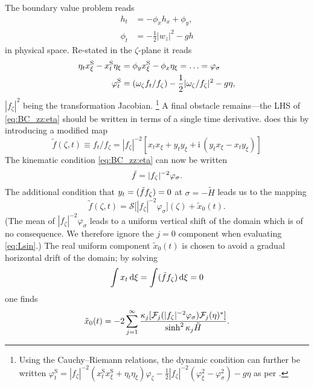 \documentclass[a4paper,12pt]{article}
\newcommand{\mr}{\mathrm}
\newcommand{\mc}{\mathcal}
\renewcommand{\S}{^\mr{S}}
\newcommand{\ii}{\mr{i}\,}
\renewcommand{\_}[1]{_\mr{#1}}
\let\Re\relax
\let\Im\relax
\DeclareMathOperator\Re{Re}
\DeclareMathOperator\Im{Im}
\newcommand{\rbr}[1]{\left(#1\right)}
\newcommand{\z}{z}
\newcommand{\x}{x}
\newcommand{\y}{y}
\newcommand{\zz}{\zeta}
\newcommand{\xx}{\xi}
\newcommand{\yy}{\sigma}
\newcommand{\kk}{\kappa}
\newcommand{\zmap}{f}
\newcommand{\ww}{\omega}
\newcommand{\Hzz}{\tilde H}
\newcommand{\hzz}{\eta}
\newcommand{\Lsin}{\mc S}
\newcommand{\FF}{\mc F}
\newcommand{\xS}{\x\S}
\newcommand{\tf}{\tilde \zmap}
\begin{document}
The boundary value problem reads 
\begin{align*}
h_t &=- \phi_x h_x+\phi_y,\\
\phi_t &=- \frac12|w_\z|^2-gh
\end{align*}
in physical space.
Re-stated in the $\zz$-plane it reads
\begin{subequations}
\begin{align}
\hzz_t\xS_\xx - \xS_t\hzz_\xx &= \phi_\y\xS_\xx-\phi_\x\hzz_\xx = \ldots = \varphi_\yy \label{eq:BC_zz:eta} \\
\varphi\S_t &= \Re(\ww_\zz f_t/ f_\zz)  - \frac12 |\ww_\zz/ f_\zz|^2  - g \hzz,\label{eq:BC_zz:phi}
\end{align}%
\label{eq:BC_zz}%
\end{subequations}%
$|\zmap_\zz|^{2}$ being the transformation Jacobian.%
 \footnote{Using the Cauchy--Riemann relations, the dynamic condition can further be written
$\varphi\S_t = |\zmap_\zz|^{-2} (\xS_t\xS_\xx + \hzz_t\hzz_\xx)\varphi_\zz - \frac12 |\zmap_\zz|^{-2} \rbr{\varphi_\xx^2-\varphi_\yy^2}  - g \hzz$ as per \citet{chalikov2005modeling}.} 
A final obstacle remains---the LHS of \eqref{eq:BC_zz:eta} should be written in terms of a single time derivative.
\citet{chalikov2005modeling} does this by introducing a modified map
\begin{equation}
\tf(\zz,t)\equiv\zmap_t/\zmap_\zz = |\zmap_\zz|^{-2}[\x_t\x_\xx + \y_t\y_\xx +\ii(\y_t\x_\xx - \x_t\y_\xx ) ]
\label{eq:tf}
\end{equation}
The kinematic condition \eqref{eq:BC_zz:eta} can now be written
\begin{equation}
\Im \tf = |\zmap_\zz|^{-2}\varphi_\yy.
\label{eq:BC_zz2:eta}%
\end{equation}%
The additional condition that $\y_t=\Im(\tf\zmap_\zz)=0$ at $\yy=-\Hzz$ leads us to the mapping
\begin{equation}
\tf(\zz,t) = \Lsin\big[|\zmap_\zz|^{-2}\varphi_\yy\big](\zz) + \tilde x_{0}(t).
\label{eq:tfMap}
\end{equation}
(The mean of $|\zmap_\zz|^{-2}\varphi_\yy$ leads to a uniform vertical shift of the domain which is of no consequence. We therefore ignore the $j=0$ component when evaluating \eqref{eq:Lsin}.)
The real uniform component $\tilde x_{0}(t)$ is chosen to avoid a gradual horizontal drift of the domain; 
by solving 
\[\int x_t\,\mr d\xx=\int\Re(\tf \zmap_\zz) \,\mr d \xx = 0\]
one finds
\begin{equation}
\tilde x_{0}(t) = -2\sum_{j=1}^\infty \frac{\kk_j \Im[\FF_j(|\zmap_\zz|^{-2}\varphi_\yy)\FF_j(\eta)^*]}{\sinh^2\kk_j\Hzz}.
\label{eq:tx0}
\end{equation}
\end{document}
